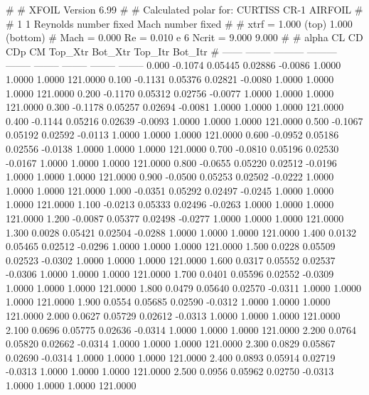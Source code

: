 #  
#       XFOIL         Version 6.99
#  
# Calculated polar for: CURTISS CR-1 AIRFOIL                            
#  
# 1 1 Reynolds number fixed          Mach number fixed         
#  
# xtrf =   1.000 (top)        1.000 (bottom)  
# Mach =   0.000     Re =     0.010 e 6     Ncrit =   9.000  9.000
#  
#   alpha    CL        CD       CDp       CM     Top_Xtr  Bot_Xtr  Top_Itr  Bot_Itr
#  ------ -------- --------- --------- -------- -------- -------- -------- --------
   0.000  -0.1074   0.05445   0.02886  -0.0086   1.0000   1.0000   1.0000 121.0000
   0.100  -0.1131   0.05376   0.02821  -0.0080   1.0000   1.0000   1.0000 121.0000
   0.200  -0.1170   0.05312   0.02756  -0.0077   1.0000   1.0000   1.0000 121.0000
   0.300  -0.1178   0.05257   0.02694  -0.0081   1.0000   1.0000   1.0000 121.0000
   0.400  -0.1144   0.05216   0.02639  -0.0093   1.0000   1.0000   1.0000 121.0000
   0.500  -0.1067   0.05192   0.02592  -0.0113   1.0000   1.0000   1.0000 121.0000
   0.600  -0.0952   0.05186   0.02556  -0.0138   1.0000   1.0000   1.0000 121.0000
   0.700  -0.0810   0.05196   0.02530  -0.0167   1.0000   1.0000   1.0000 121.0000
   0.800  -0.0655   0.05220   0.02512  -0.0196   1.0000   1.0000   1.0000 121.0000
   0.900  -0.0500   0.05253   0.02502  -0.0222   1.0000   1.0000   1.0000 121.0000
   1.000  -0.0351   0.05292   0.02497  -0.0245   1.0000   1.0000   1.0000 121.0000
   1.100  -0.0213   0.05333   0.02496  -0.0263   1.0000   1.0000   1.0000 121.0000
   1.200  -0.0087   0.05377   0.02498  -0.0277   1.0000   1.0000   1.0000 121.0000
   1.300   0.0028   0.05421   0.02504  -0.0288   1.0000   1.0000   1.0000 121.0000
   1.400   0.0132   0.05465   0.02512  -0.0296   1.0000   1.0000   1.0000 121.0000
   1.500   0.0228   0.05509   0.02523  -0.0302   1.0000   1.0000   1.0000 121.0000
   1.600   0.0317   0.05552   0.02537  -0.0306   1.0000   1.0000   1.0000 121.0000
   1.700   0.0401   0.05596   0.02552  -0.0309   1.0000   1.0000   1.0000 121.0000
   1.800   0.0479   0.05640   0.02570  -0.0311   1.0000   1.0000   1.0000 121.0000
   1.900   0.0554   0.05685   0.02590  -0.0312   1.0000   1.0000   1.0000 121.0000
   2.000   0.0627   0.05729   0.02612  -0.0313   1.0000   1.0000   1.0000 121.0000
   2.100   0.0696   0.05775   0.02636  -0.0314   1.0000   1.0000   1.0000 121.0000
   2.200   0.0764   0.05820   0.02662  -0.0314   1.0000   1.0000   1.0000 121.0000
   2.300   0.0829   0.05867   0.02690  -0.0314   1.0000   1.0000   1.0000 121.0000
   2.400   0.0893   0.05914   0.02719  -0.0313   1.0000   1.0000   1.0000 121.0000
   2.500   0.0956   0.05962   0.02750  -0.0313   1.0000   1.0000   1.0000 121.0000
